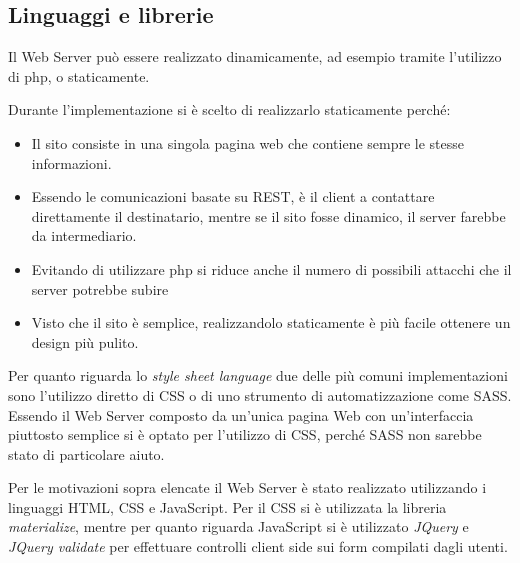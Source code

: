 \newpage

\subsection{Linguaggi e librerie}

Il Web Server può essere realizzato dinamicamente, ad esempio tramite l'utilizzo di php, o staticamente.

Durante l'implementazione si è scelto di realizzarlo staticamente perché:
\begin{itemize}
	\item Il sito consiste in una singola pagina web che contiene sempre le stesse informazioni.
	\item Essendo le comunicazioni basate su REST, è il client a contattare direttamente il destinatario, mentre se il sito fosse dinamico, il server farebbe da intermediario.
	\item Evitando di utilizzare php si riduce anche il numero di possibili attacchi che il server potrebbe subire
	\item Visto che il sito è semplice, realizzandolo staticamente è più facile ottenere un design più pulito.
\end{itemize}

Per quanto riguarda lo \textit{style sheet language} due delle più comuni implementazioni sono l'utilizzo diretto di CSS o di uno strumento di automatizzazione come SASS.
Essendo il Web Server composto da un'unica pagina Web con un'interfaccia piuttosto semplice si è optato per l'utilizzo di CSS, perché SASS non sarebbe stato di particolare aiuto.

Per le motivazioni sopra elencate il Web Server è stato realizzato utilizzando i linguaggi HTML, CSS e JavaScript.
Per il CSS si è utilizzata la libreria \textit{materialize}, mentre per quanto riguarda JavaScript si è utilizzato \textit{JQuery} e \textit{JQuery validate} per effettuare controlli client side sui form compilati dagli utenti.


